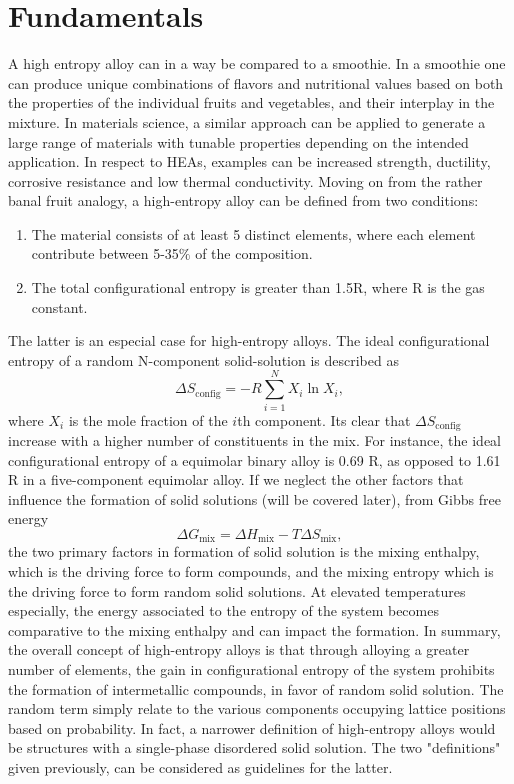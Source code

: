 \section{Fundamentals} 
A high entropy alloy can in a way be compared to a smoothie. In a smoothie one can produce unique combinations of flavors and nutritional values based on both the properties of the individual fruits and vegetables, and their interplay in the mixture. In materials science, a similar approach can be applied to generate a large range of materials with tunable properties depending on the intended application. In respect to HEAs, examples can be increased strength, ductility, corrosive resistance and low thermal conductivity. Moving on from the rather banal fruit analogy, a high-entropy alloy can be defined from two conditions:
\begin{enumerate}
    \item The material consists of at least 5 distinct elements, where each element contribute between 5-35$\%$ of the composition.
    \item The total configurational entropy is greater than 1.5R, where R is the gas constant. 
\end{enumerate}
The latter is an especial case for high-entropy alloys. The ideal configurational entropy of a random N-component solid-solution is described as
\begin{equation}
\Delta S_{\text{config}} = -R \sum_{i=1}^{N}X_i\ln X_i,
\end{equation}
where $X_i$ is the mole fraction of the $i$th component. Its clear that $\Delta S_{\text{config}}$ increase with a higher number of constituents in the mix. For instance, the ideal configurational entropy of a equimolar binary alloy is 0.69 R, as opposed to 1.61 R in a five-component equimolar alloy. If we neglect the other factors that influence the formation of solid solutions (will be covered later), from Gibbs free energy
\begin{equation}
\Delta G_{\text{mix}} = \Delta H_{\text{mix}} - T\Delta S_{\text{mix}},
\end{equation} 
the two primary factors in formation of solid solution is the mixing enthalpy, which is the driving force to form compounds, and the mixing entropy which is the driving force to form random solid solutions. At elevated temperatures especially, the energy associated to the entropy of the system becomes comparative to the mixing enthalpy and can impact the formation. In summary, the overall concept of high-entropy alloys is that through alloying a greater number of elements, the gain in configurational entropy of the system prohibits the formation of intermetallic compounds, in favor of random solid solution. The random term simply relate to the various components occupying lattice positions based on probability. In fact, a narrower definition of high-entropy alloys would be structures with a single-phase disordered solid solution. The two "definitions" given previously, can be considered as guidelines for the latter.
 
